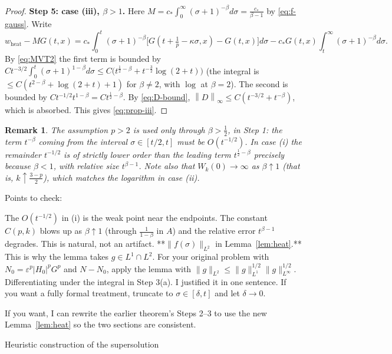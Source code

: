 \documentclass[11pt]{amsart}
\makeatletter
\newtheorem{remark}{Remark}[section]
\theoremstyle{definition}
\theoremstyle{remark}
\numberwithin{equation}{section}
\newcommand{\ep}{\varepsilon}
\newcommand{\norm}[1]{\left\lVert #1\right\rVert}
\def\section{\@startsection{section}{1}%
  \z@{1.5\linespacing\@plus\linespacing}{.5\linespacing}%
  {\normalfont\bfseries\large\centering}}
\makeatother
\begin{document}
\begin{proof}
\medskip
\noindent\textbf{Step 5: case (iii), $\beta>1$.}
Here $M=c_*\int_0^\infty(\sigma+1)^{-\beta}d\sigma=\frac{c_*}{\beta-1}$ by \eqref{eq:f-gauss}. Write
\[
w_{\mathrm{heat}}-MG(t,x)=c_*\int_0^t(\sigma+1)^{-\beta}\bigl[G(t+\tfrac1p-\kappa\sigma,x)-G(t,x)\bigr]d\sigma
-c_*G(t,x)\int_t^\infty(\sigma+1)^{-\beta}d\sigma .
\]
By \eqref{eq:MVT2} the first term is bounded by
$Ct^{-3/2}\int_0^t(\sigma+1)^{1-\beta}d\sigma\le C\bigl(t^{\frac12-\beta}+t^{-\frac32}\log(2+t)\bigr)$
(the integral is $\le C(t^{2-\beta}+\log(2+t)+1)$ for $\beta\neq2$, with $\log$ at $\beta=2$).
The second is bounded by $Ct^{-1/2}t^{1-\beta}=Ct^{\frac12-\beta}$. By \eqref{eq:D-bound},
$\norm{D}_\infty\le C(t^{-3/2}+t^{-\beta})$, which is absorbed. This gives \eqref{eq:prop-iii}.
\end{proof}

\begin{remark}\label{rem:where-p>2}
The assumption $p>2$ is used only through $\beta>\frac12$, in Step 1: the term $t^{-\beta}$ coming from the interval
$\sigma\in[t/2,t]$ must be $O(t^{-1/2})$. In case (i) the remainder $t^{-1/2}$ is of strictly lower order than the leading term
$t^{\frac12-\beta}$ precisely because $\beta<1$, with relative size $t^{\beta-1}$. Note also that $W_k(0)\to\infty$
as $\beta\uparrow1$ (that is, $k\uparrow\frac{3-p}2$), which matches the logarithm in case (ii).
\end{remark}

Points to check:

The $O(t^{-1/2})$ in (i) is the weak point near the endpoints. The constant $C(p,k)$ blows up as $\beta\uparrow1$ (through $\frac1{1-\beta}$ in $A$) and the relative error $t^{\beta-1}$ degrades. This is natural, not an artifact.
**$\|f(\sigma)\|_{L^2}$ in Lemma~\ref{lem:heat}.** This is why the lemma takes $g\in L^1\cap L^2$. For your original problem with $N_0=\ep^p|H_0|^pG^p$ and $N-N_0$, apply the lemma with $\|g\|_{L^2}\le\|g\|_{L^1}^{1/2}\|g\|_{L^\infty}^{1/2}$.
Differentiating under the integral in Step 3(a). I justified it in one sentence. If you want a fully formal treatment, truncate to $\sigma\in[\delta,t]$ and let $\delta\to0$.

If you want, I can rewrite the earlier theorem’s Steps 2–3 to use the new Lemma~\ref{lem:heat} so the two sections are consistent.

\section{Heuristic construction of the supersolution}
\end{document}
